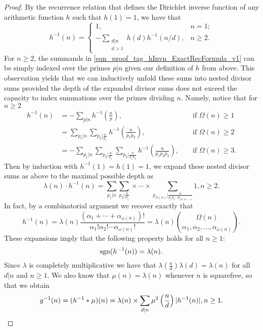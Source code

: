 \documentclass[11pt,reqno,a4letter]{article}
\numberwithin{figure}{section}
\numberwithin{table}{section}
\theoremstyle{plain}
\numberwithin{theorem}{section}
\theoremstyle{definition}
\begin{document}
\begin{proof}
By the recurrence relation that defines the Dirichlet inverse function of any 
arithmetic function $h$ such that $h(1) = 1$, we have that \cite[\S 2.7]{APOSTOLANUMT} 
\begin{equation} 
\label{eqn_proof_tag_hInvn_ExactRecFormula_v1}
h^{-1}(n) = \begin{cases} 
            1, & n = 1; \\ 
            -\sum\limits_{\substack{d|n \\ d>1}} h(d) h^{-1}(n/d), & n \geq 2. 
            \end{cases} 
\end{equation} 
For $n \geq 2$, the summands in \eqref{eqn_proof_tag_hInvn_ExactRecFormula_v1} 
can be simply indexed over the primes $p|n$ given our definition of $h$ from above. 
This observation yields that we can inductively 
unfold these sums into nested divisor sums provided the depth of the 
expanded divisor sums does not exceed the 
capacity to index summations over the primes dividing $n$. Namely, notice that for $n \geq 2$ 
\begin{align*} 
h^{-1}(n) & = -\sum_{p|n} h^{-1}\left(\frac{n}{p}\right), && \text{\ if\ } \Omega(n) \geq 1 \\ 
     & = \sum_{p_1|n} \sum_{p_2|\frac{n}{p_1}} h^{-1}\left(\frac{n}{p_1p_2}\right), && \text{\ if\ } \Omega(n) \geq 2 \\ 
     & = -\sum_{p_1|n} \sum_{p_2|\frac{n}{p_1}} \sum_{p_3|\frac{n}{p_1p_2}} h^{-1}\left(\frac{n}{p_1p_2p_3}\right), 
     && \text{\ if\ } \Omega(n) \geq 3. 
\end{align*} 
Then by induction with $h^{-1}(1) = h(1) = 1$, we expand these 
nested divisor sums as above to the maximal possible depth as 
\begin{equation} 
\label{eqn_proof_tag_hInvn_ExactNestedSumFormula_v2} 
\lambda(n) \cdot h^{-1}(n) = \sum_{p_1|n} \sum_{p_2|\frac{n}{p_1}} \times \cdots \times 
     \sum_{p_{\Omega(n)}|\frac{n}{p_1p_2 \cdots p_{\Omega(n)-1}}} 1, n \geq 2. 
\end{equation} 
In fact, by a combinatorial argument we recover exactly that 
\begin{equation} 
\label{eqn_proof_tag_hInvn_ExactNestedSumFormula_CombInterpetIdent_v3} 
h^{-1}(n) = \lambda(n) \frac{(\alpha_1+\cdots+\alpha_{\omega(n)})!}{ 
     \alpha_1! \alpha_2! \cdots \alpha_{\omega(n)}!} = 
     \lambda(n) \binom{\Omega(n)}{\alpha_1,\alpha_2,\ldots,\alpha_{\omega(n)}}. 
\end{equation} 
These expansions imply that the following property holds for all $n \geq 1$: 
\begin{equation} 
\notag 
\operatorname{sgn}(h^{-1}(n)) = \lambda(n). 
\end{equation} 
Since $\lambda$ is completely multiplicative we have that 
$\lambda\left(\frac{n}{d}\right) \lambda(d) = \lambda(n)$ for all 
$d|n$ and $n \geq 1$. We also know that $\mu(n) = \lambda(n)$ whenever $n$ is squarefree, 
so that we obtain
\[
g^{-1}(n) = (h^{-1} \ast \mu)(n) = \lambda(n) \times \sum_{d|n} \mu^2\left(\frac{n}{d}\right) |h^{-1}(n)|, n \geq 1. 
     \qedhere 
\]
\end{proof} 
\end{document}
